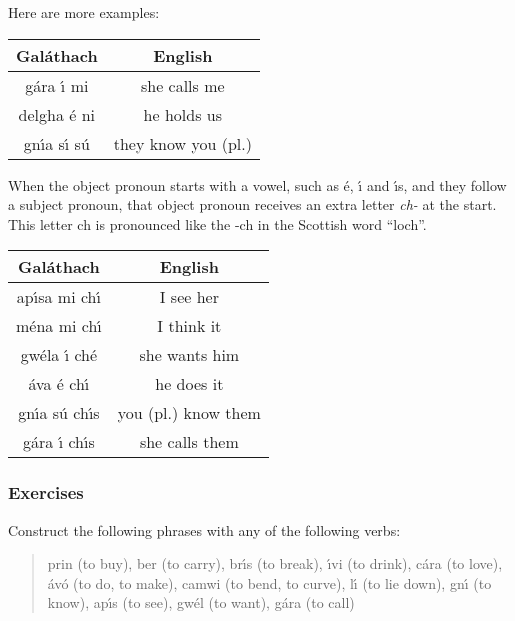 Here are more examples:
\begin{table}[H]
\centering
\begin{tabu}{c|c}
  \textbf{Gal\'{a}thach} & \textbf{English}\\
  \toprule
   g\'{a}ra \'{\i} mi & she calls me\\
   delgha \'{e} ni & he holds us\\
   gn\'{\i}a s\'{\i} s\'{u} & they know you (pl.)
\end{tabu}
\label{examples_verbs_vso_more_examples}
\end{table}

When the object pronoun starts with a vowel, such as \'{e}, \'{\i} and \'{\i}s, and they follow a subject pronoun, that object pronoun receives an extra letter \textit{ch-} at the start. This letter ch is pronounced like the -ch in the Scottish word ``loch''.
\begin{table}[H]
\centering
\begin{tabu}{c|c}
  \textbf{Gal\'{a}thach} & \textbf{English}\\
  \toprule
  ap\'{\i}sa mi ch\'{\i} & I see her\\
  m\'{e}na mi ch\'{\i} & I think it\\
  gw\'{e}la \'{\i} ch\'{e} & she wants him\\
  \'{a}va \'{e} ch\'{\i} & he does it\\
  gn\'{\i}a s\'{u} ch\'{\i}s & you (pl.) know them\\
  g\'{a}ra \'{\i} ch\'{\i}s & she calls them
\end{tabu}
\label{examples_verbs_vso_extra_ch}
\end{table}

\newpage
\subsubsection{Exercises}

Construct the following phrases with any of the following verbs:\\

\begin{quote}
prin (to buy), ber (to carry), br\'{\i}s (to break), \'{\i}vi (to drink), c\'{a}ra (to love), \'{a}v\'{o} (to do, to make), camwi (to bend, to curve), l\'{\i} (to lie down), gn\'{\i} (to know), ap\'{\i}s (to see), gw\'{e}l (to want), g\'{a}ra (to call)
\end{quote}

